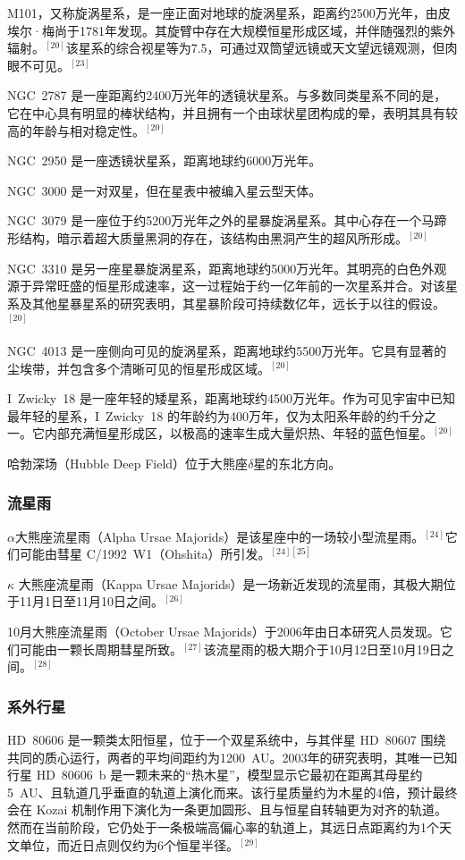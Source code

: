 M101，又称旋涡星系，是一座正面对地球的旋涡星系，距离约2500万光年，由皮埃尔·梅尚于1781年发现。其旋臂中存在大规模恒星形成区域，并伴随强烈的紫外辐射。$^{[20]}$该星系的综合视星等为7.5，可通过双筒望远镜或天文望远镜观测，但肉眼不可见。$^{[23]}$

NGC~2787 是一座距离约2400万光年的透镜状星系。与多数同类星系不同的是，它在中心具有明显的棒状结构，并且拥有一个由球状星团构成的晕，表明其具有较高的年龄与相对稳定性。$^{[20]}$

NGC~2950 是一座透镜状星系，距离地球约6000万光年。

NGC~3000 是一对双星，但在星表中被编入星云型天体。

NGC~3079 是一座位于约5200万光年之外的星暴旋涡星系。其中心存在一个马蹄形结构，暗示着超大质量黑洞的存在，该结构由黑洞产生的超风所形成。$^{[20]}$

NGC~3310 是另一座星暴旋涡星系，距离地球约5000万光年。其明亮的白色外观源于异常旺盛的恒星形成速率，这一过程始于约一亿年前的一次星系并合。对该星系及其他星暴星系的研究表明，其星暴阶段可持续数亿年，远长于以往的假设。$^{[20]}$

NGC~4013 是一座侧向可见的旋涡星系，距离地球约5500万光年。它具有显著的尘埃带，并包含多个清晰可见的恒星形成区域。$^{[20]}$

I~Zwicky~18 是一座年轻的矮星系，距离地球约4500万光年。作为可见宇宙中已知最年轻的星系，I~Zwicky~18 的年龄约为400万年，仅为太阳系年龄的约千分之一。它内部充满恒星形成区，以极高的速率生成大量炽热、年轻的蓝色恒星。$^{[20]}$

哈勃深场（Hubble Deep Field）位于大熊座$\delta$星的东北方向。
\subsubsection{流星雨}  
$\alpha$大熊座流星雨（Alpha Ursae Majorids）是该星座中的一场较小型流星雨。$^{[24]}$它们可能由彗星 C/1992~W1（Ohshita）所引发。$^{[24][25]}$

$\kappa$ 大熊座流星雨（Kappa Ursae Majorids）是一场新近发现的流星雨，其极大期位于11月1日至11月10日之间。$^{[26]}$

10月大熊座流星雨（October Ursae Majorids）于2006年由日本研究人员发现。它们可能由一颗长周期彗星所致。$^{[27]}$该流星雨的极大期介于10月12日至10月19日之间。$^{[28]}$
\subsubsection{系外行星}  
HD~80606 是一颗类太阳恒星，位于一个双星系统中，与其伴星 HD~80607 围绕共同的质心运行，两者的平均间距约为1200~AU。2003年的研究表明，其唯一已知行星 HD~80606~b 是一颗未来的“热木星”，模型显示它最初在距离其母星约5~AU、且轨道几乎垂直的轨道上演化而来。该行星质量约为木星的4倍，预计最终会在 Kozai 机制作用下演化为一条更加圆形、且与恒星自转轴更为对齐的轨道。然而在当前阶段，它仍处于一条极端高偏心率的轨道上，其远日点距离约为1个天文单位，而近日点则仅约为6个恒星半径。$^{[29]}$
